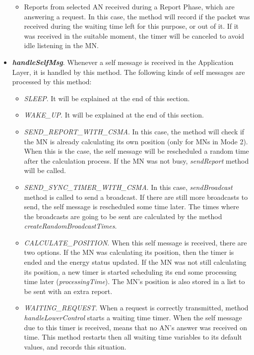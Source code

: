 \begin{itemize}
\begin{itemize}
    \item Reports from selected \ac{AN} received during a Report Phase, which are answering a request. In this case, the method will record if the packet was
    received during the waiting time left for this purpose, or out of it. If it was received in the suitable moment, the timer will be canceled to
    avoid idle listening in the \ac{MN}.
  \end{itemize}

  \item \textbf{\textit{handleSelfMsg}}. Whenever a self message is received in the Application Layer, it is handled by this method. The following 
  kinds of self messages are processed by this method:
  \begin{itemize}
    \item \textit{SLEEP}. It will be explained at the end of this section.

    \item \textit{WAKE\_UP}. It will be explained at the end of this section.

    \item \textit{SEND\_REPORT\_WITH\_CSMA}. In this case, the method will check if the \ac{MN} is already calculating its own position (only for 
    \acp{MN} in Mode 2). When this is the case, the self message will be rescheduled a random time after the calculation process. If the \ac{MN} 
    was not busy, \textit{sendReport} method will be called.

    \item \textit{SEND\_SYNC\_TIMER\_WITH\_CSMA}. In this case, \textit{sendBroadcast} method is called to send a broadcast. If there are still 
    more broadcasts to send, the self message is rescheduled some time later. The times where the broadcasts are going to be sent are calculated 
    by the method \textit{createRandomBroadcastTimes}.

    \item \textit{CALCULATE\_POSITION}. When this self message is received, there are two options. If the \ac{MN} was calculating its position, then
    the timer is ended and the energy status updated. If the \ac{MN} was not still calculating its position, a new timer is started scheduling its end
    some processing time later (\textit{processingTime}). The \ac{MN}'s position is also stored in a list to be sent with an extra report.

    \item \textit{WAITING\_REQUEST}. When a request is correctly transmitted, method \textit{handleLowerControl} starts a waiting time timer. When the
    self message due to this timer is received, means that no \ac{AN}'s answer was received on time. This method restarts then all waiting time 
    variables to its default values, and records this situation.


\end{itemize}
\end{itemize}
